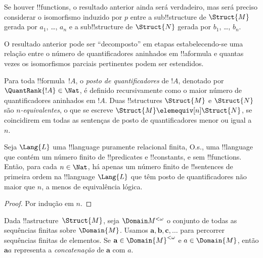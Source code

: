 \documentclass[../../../include/open-logic-section]{subfiles}
\begin{document}
\begin{rem}
Se houver !!{function}s, o resultado anterior ainda será verdadeiro, mas
será preciso considerar o isomorfismo induzido por $p$ entre a
sub!!{structure} de $\Struct{M}$ gerada por $a_1$, \dots, $a_n$ e a
sub!!{structure} de $\Struct{N}$ gerada por $b_1$, \dots, $b_n$.
\end{rem}

O resultado anterior pode ser ``decomposto'' em etapas estabelecendo-se uma
relação entre o número de quantificadores aninhados em !!a{formula} e
quantas vezes os isomorfismos parciais pertinentes podem ser estendidos.

\begin{defn}
  Para toda !!{formula}~$!A$, o \emph{posto de quantificadores} de $!A$,
  denotado por $\QuantRank{!A} \in \Nat$, é definido recursivamente como
  o maior número de quantificadores aninhados em $!A$. Duas
  !!{structure}s $\Struct{M}$ e $\Struct{N}$ são \emph{$n$-equivalentes},
  o que se escreve $\Struct{M} \elemequiv[n] \Struct{N}$, se coincidirem
  em todas as sentenças de posto de quantificadores menor ou igual a~$n$.
\end{defn}

\begin{prop}
  Seja $\Lang{L}$ uma !!{language} puramente relacional finita, O.s.\@, uma
  !!{language} que contém um número finito de !!{predicate}s e !!{constant}s,
  e sem !!{function}s. Então, para cada $n \in \Nat$, há apenas um
  número finito de !!{sentence}s de primeira ordem na !!{language}
  $\Lang{L}$ que têm posto de quantificadores não maior que $n$, a menos
  de equivalência lógica.
\end{prop}

\begin{proof}
  Por indução em $n$.
\end{proof}

\begin{defn}
  Dada !!a{structure}~$\Struct{M}$, seja $\Domain M^{<\omega}$ o conjunto de
  todas as sequências finitas sobre $\Domain{M}$. Usamos $\mathbf{a},
  \mathbf{b}, \mathbf{c}, \ldots$ para percorrer sequências finitas de
  elementos. Se $\mathbf{a} \in \Domain{M}^{<\omega}$ e $a \in \Domain{M}$, então
  $\mathbf{a}a$ representa a \emph{concatenação} de $\mathbf{a}$ com $a$.
\end{defn}
\end{document}
